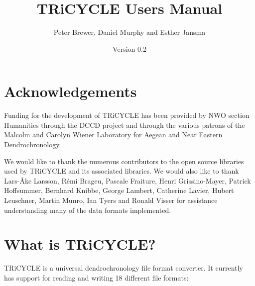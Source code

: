 \documentclass[10pt, headsepline,DIV14,BCOR0.5cm]{scrreprt}
\title{TRiCYCLE Users Manual}
\author{Peter Brewer, Daniel Murphy and Esther Jansma}
\date{Version 0.2}
\begin{document}
\maketitle


\tableofcontents

\chapter{Acknowledgements}

Funding for the development of TRiCYCLE has been provided by NWO section Humanities through the
DCCD project and through the various patrons of the Malcolm and Carolyn Wiener Laboratory for Aegean
and Near Eastern Dendrochronology.

We would like to thank the numerous contributors to the open source libraries used by TRiCYCLE and
its associated libraries. We would also like to thank Lars-Åke Larsson, Rémi Brageu, Pascale Fraiture,
Henri Grissino-Mayer, Patrick Hoffsummer, Bernhard Knibbe, George Lambert, Catherine Lavier, Hubert
Leuschner, Martin Munro, Ian Tyers and Ronald Visser for assistance understanding many of the data
formats implemented.

\chapter{What is TRiCYCLE?}

TRiCYCLE is a universal dendrochronology file format converter. It currently has support for reading and
writing 18 different file formats:
\end{document}
